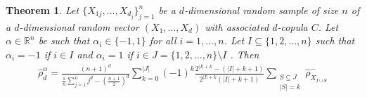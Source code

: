 \documentclass[11pt,a4paper]{article}
\newtheorem{theorem}{Theorem}
\begin{document}
\begin{theorem}{\label{th:est}}
    Let $\{X_{1j},\ldots,X_{d_j}\}_{j=1}^n$ be a $d$-dimensional random sample of size $n$ of a $d$-dimensional random vector $(X_1,\ldots,X_d)$ with associated $d$-copula $C$. Let $\alpha\in\mathbb{R}^n$ be such that $\alpha_i\in\{-1,1\}$ for all $i=1,\ldots,n$. Let $I\subseteq\{1,2,\ldots,n\}$ such that $\alpha_i=-1$ if $i\in I$ and $\alpha_i=1$ if $i\in J=\{1,2,\ldots,n\}\setminus I$%
    . Then
\begin{align}\label{eq:estimator}
\widehat{\rho}_d^{\alpha} = \frac{(n+1)^d}{\frac{1}{n}\sum_{j=1}^nj^d-\left(\frac{n+1}{2}\right)^d} \sum_{k=0}^{|J|} (-1)^k \frac{2^{|I|+k}-(|I|+k+1)}{2^{|I|+k}(|I|+k+1)} \sum_{\substack{S \subseteq J \\ |S|=k}} \widehat{\rho}_{X_{I\cup S}}^-
\end{align}
\end{theorem}
\end{document}
